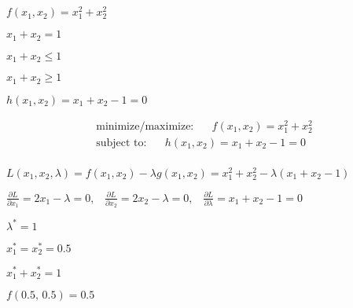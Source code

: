 \documentclass{article}
\def\lthtmlcheckvsize{\ifdim\ht\sizebox<\vsize 
  \ifdim\wd\sizebox<\hsize\expandafter\hfill\fi \expandafter\vfill
  \else\expandafter\vss\fi}%
\begin{document}
{\newpage\clearpage
{}%
$ f(x_1,x_2)=x^2_1+x^2_2$%
\lthtmlindisplaymathZ
\lthtmlcheckvsize\clearpage}

{\newpage\clearpage
{}%
$ x_1+x_2=1$%
\lthtmlindisplaymathZ
\lthtmlcheckvsize\clearpage}

{\newpage\clearpage
{}%
$ x_1+x_2\le 1$%
\lthtmlindisplaymathZ
\lthtmlcheckvsize\clearpage}

{\newpage\clearpage
{}%
$ x_1+x_2\ge 1$%
\lthtmlindisplaymathZ
\lthtmlcheckvsize\clearpage}

{\newpage\clearpage
{}%
$ h(x_1,x_2)=x_1+x_2-1=0$%
\lthtmlindisplaymathZ
\lthtmlcheckvsize\clearpage}

{\newpage\clearpage
{}%
\begin{displaymath}\begin{array}{ll}
\mbox{minimize/maximize:}\;\;\;\;\;\;f(x_1,x_2)=x^2_1+x^2_2\\
\mbox{subject to:}\;\;\;\;\;\;h(x_1,x_2)=x_1+x_2-1=0\\
\end{array}\end{displaymath}%
\lthtmldisplayZ
\lthtmlcheckvsize\clearpage}

{\newpage\clearpage
{}%
$\displaystyle L(x_1,x_2,\lambda)=f(x_1,x_2)-\lambda g(x_1,x_2)
=x^2_1+x^2_2-\lambda(x_1+x_2-1)$%
\lthtmlindisplaymathZ
\lthtmlcheckvsize\clearpage}

{\newpage\clearpage
{}%
$\displaystyle \frac{\partial L}{\partial x_1}=2x_1-\lambda=0,\;\;\;
\frac{\partial L}{\partial x_2}=2x_2-\lambda=0,\;\;\;
\frac{\partial L}{\partial \lambda}=x_1+x_2-1=0$%
\lthtmlindisplaymathZ
\lthtmlcheckvsize\clearpage}

{\newpage\clearpage
{}%
$ \lambda^*=1$%
\lthtmlindisplaymathZ
\lthtmlcheckvsize\clearpage}

{\newpage\clearpage
{}%
$ x_1^*=x_2^*=0.5$%
\lthtmlindisplaymathZ
\lthtmlcheckvsize\clearpage}

{\newpage\clearpage
{}%
$ x_1^*+x_2^*=1$%
\lthtmlindisplaymathZ
\lthtmlcheckvsize\clearpage}

{\newpage\clearpage
{}%
$ f(0.5,\,0.5)=0.5$%
\lthtmlindisplaymathZ
\lthtmlcheckvsize\clearpage}
\end{document}
